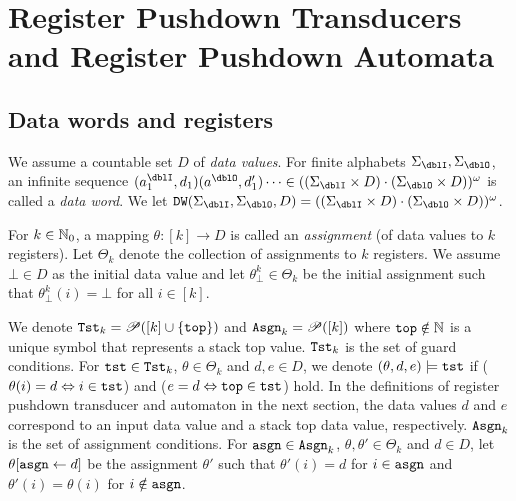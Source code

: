 \section{Register Pushdown Transducers and Register Pushdown Automata}
\subsection{Data words and registers}
We assume a countable set $D$ of \emph{data values}.
For finite alphabets $\Sigma_\dblI,\Sigma_\dblO$,
an infinite sequence $(a^\dblI_1,d_1)(a^\dblO,d'_1)\cdots \in ((\Sigma_\dblI\times D)\cdot(\Sigma_\dblO\times D))^\omega$ is called a \emph{data word}.
We let $\DW(\Sigma_\dblI,\Sigma_\dblO,D)=((\Sigma_\dblI\times D)\cdot(\Sigma_\dblO\times D))^\omega$.

For $k\in\mathbb{N}_0$, a mapping $\theta: [k] \to D$ is called an \emph{assignment}
(of data values to $k$ registers).
Let $\Theta_k$ denote the collection of assignments to $k$ registers.
We assume $\bot\in D$ as the initial data value and
let $\theta^k_\bot\in\Theta_k$ be the initial assignment such that
$\theta^k_\bot(i)=\bot$ for all $i\in[k]$.

We denote $\mathtt{Tst}_k = \mathscr{P}([k]\cup\{\mathtt{top}\})$ and $\mathtt{Asgn}_k = \mathscr{P}([k])$
where $\mathtt{top}\notin\mathbb{N}$ is a unique symbol that represents a stack top value.
$\mathtt{Tst}_k$ is the set of guard conditions.
For $\mathtt{tst}\in\mathtt{Tst}_k$, $\theta\in\Theta_k$ and $d,e\in D$,
we denote $(\theta,d,e)\models\mathtt{tst}$
if ($\theta(i) = d \Leftrightarrow i\in\mathtt{tst}$)
and ($e = d \Leftrightarrow \mathtt{top}\in\mathtt{tst}$) hold.
In the definitions of register pushdown transducer and automaton in the next section,
the data values $d$ and $e$ correspond to an input data value and a stack top data value, respectively.
$\mathtt{Asgn}_k$ is the set of assignment conditions.
For $\mathtt{asgn}\in\mathtt{Asgn}_k$, $\theta,\theta'\in\Theta_k$ and $d\in D$,
let $\theta[\mathtt{asgn}\leftarrow d]$ be the assignment
$\theta'$ such that $\theta'(i) = d$ for $i\in\mathtt{asgn}$ and $\theta'(i)=\theta(i)$ for $i\notin\mathtt{asgn}$.

